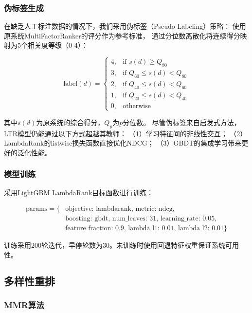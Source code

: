 \documentclass[10pt,a4paper]{article}
\begin{document}
\subsubsection{伪标签生成}

在缺乏人工标注数据的情况下，我们采用伪标签（Pseudo-Labeling）策略：
使用原系统MultiFactorRanker的评分作为参考标准，
通过分位数离散化将连续得分映射为5个相关度等级（0-4）：

\begin{equation}
\text{label}(d) = \begin{cases}
4, & \text{if } s(d) \geq Q_{80} \\
3, & \text{if } Q_{60} \leq s(d) < Q_{80} \\
2, & \text{if } Q_{40} \leq s(d) < Q_{60} \\
1, & \text{if } Q_{20} \leq s(d) < Q_{40} \\
0, & \text{otherwise}
\end{cases}
\end{equation}

其中$s(d)$为原系统的综合得分，$Q_p$为$p$分位数。
尽管伪标签来自启发式方法，LTR模型仍能通过以下方式超越其教师：
（1）学习特征间的非线性交互；
（2）LambdaRank的listwise损失函数直接优化NDCG；
（3）GBDT的集成学习带来更好的泛化性能。

\subsubsection{模型训练}

采用LightGBM LambdaRank目标函数进行训练：

\begin{align}
\text{params} = \{ &
\text{objective: lambdarank, metric: ndcg,} \nonumber \\
& \text{boosting: gbdt, num\_leaves: 31, learning\_rate: 0.05,} \nonumber \\
& \text{feature\_fraction: 0.9, lambda\_l1: 0.01, lambda\_l2: 0.01} \}
\end{align}

训练采用200轮迭代，早停轮数为30。未训练时使用回退特征权重保证系统可用性。

\subsection{多样性重排}

\subsubsection{MMR算法}
\end{document}
